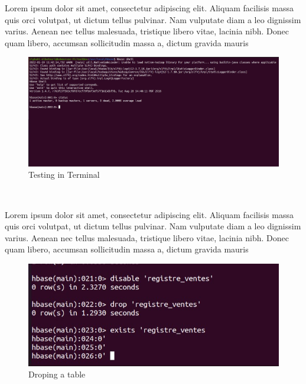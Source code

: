 \begin{spacing}{1.2}
\par Lorem ipsum dolor sit amet, consectetur adipiscing elit. Aliquam facilisis massa quis orci volutpat, ut dictum tellus pulvinar. Nam vulputate diam a leo dignissim varius. Aenean nec tellus malesuada, tristique libero vitae, lacinia nibh. Donec quam libero, accumsan sollicitudin massa a, dictum gravida mauris
\\
\begin{figure}[!htb] 
\begin{center} 
\includegraphics[width=1\linewidth]{Pictures/HBase/Configuring Hbase in Standalone & Pseudo-distributed mode/Configuring Hbase in Pseudo-distributed mode/Testing in Terminal} 
\end{center} 
\caption{Testing in Terminal} 
\end{figure}  \FloatBarrier
\\

\par Lorem ipsum dolor sit amet, consectetur adipiscing elit. Aliquam facilisis massa quis orci volutpat, ut dictum tellus pulvinar. Nam vulputate diam a leo dignissim varius. Aenean nec tellus malesuada, tristique libero vitae, lacinia nibh. Donec quam libero, accumsan sollicitudin massa a, dictum gravida mauris
\\
\begin{figure}[!htb] 
\begin{center} 
\includegraphics[width=1\linewidth]{Pictures/HBase/Configuring Hbase in Standalone & Pseudo-distributed mode/Configuring Hbase in Pseudo-distributed mode/Droping a table} 
\end{center} 
\caption{Droping a table} 
\end{figure}  \FloatBarrier
\\

\end{spacing}